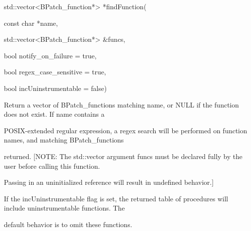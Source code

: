 




\bigskip



{

std::vector<BPatch_function*> *findFunction(}



{

const char *name,}



{

std::vector<BPatch_function*> &funcs,}



{

bool notify_on_failure = true,}



{

bool regex_case_sensitive = true,}



{

bool incUninstrumentable = false)}



{

Return a vector of BPatch_functions matching name, or NULL if the function does not exist. If name contains a

POSIX-extended regular expression, a regex search will be performed on function names, and matching BPatch_functions

returned. [NOTE: The std::vector argument funcs must be declared fully by the user before calling this function.

Passing in an uninitialized reference will result in undefined behavior.]}



{

If the incUninstrumentable flag is set, the returned table of procedures will include uninstrumentable functions. The

default behavior is to omit these functions.}



